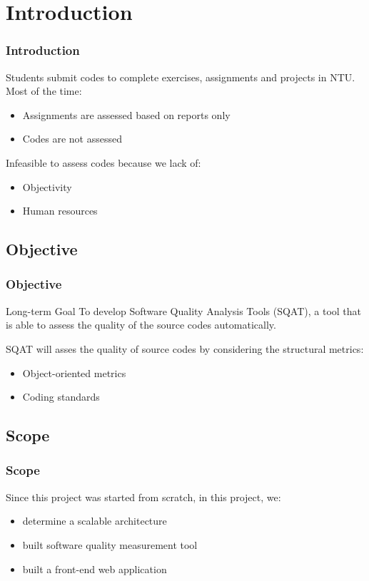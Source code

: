 \section{Introduction}
\begin{frame}
\frametitle{Introduction}

Students submit codes to complete exercises, assignments and projects in NTU. Most of the time:

\begin{itemize}
  \item Assignments are assessed based on reports only
  \item Codes are not assessed
\end{itemize} \pause

Infeasible to assess codes because we lack of:

\begin{itemize}
  \item Objectivity
  \item Human resources
\end{itemize}
\end{frame}

\subsection{Objective}
\begin{frame}
\frametitle{Objective}

\begin{block}{Long-term Goal}
To develop Software Quality Analysis Tools (SQAT), a tool that is able to assess the quality of the source codes automatically.
\end{block} \pause

SQAT will asses the quality of source codes by considering the structural metrics:

\begin{itemize}
  \item Object-oriented metrics
  \item Coding standards
\end{itemize}
\end{frame}

\subsection{Scope}
\begin{frame}
\frametitle{Scope}

Since this project was started from scratch, in this project, we:

\begin{itemize}
  \item determine a scalable architecture
  \item built software quality measurement tool
  \item built a front-end web application
\end{itemize}

\end{frame}